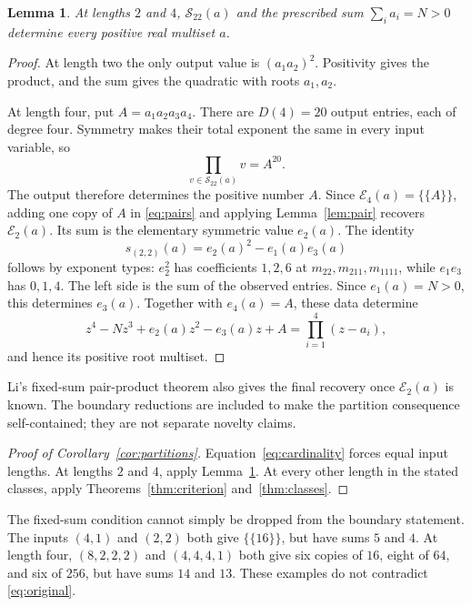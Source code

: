 \documentclass[11pt]{amsart}
\newtheorem{lemma}[theorem]{Lemma}
\theoremstyle{remark}
\newcommand{\Sxx}{\mathcal{S}_{22}}
\begin{document}
\begin{lemma}\label{lem:boundary}
At lengths $2$ and $4$, $\Sxx(a)$ and the prescribed sum
$\sum_i a_i=N>0$ determine every positive real multiset $a$.
\end{lemma}

\begin{proof}
At length two the only output value is $(a_1a_2)^2$. Positivity gives
the product, and the sum gives the quadratic with roots $a_1,a_2$.

At length four, put $A=a_1a_2a_3a_4$. There are $D(4)=20$ output
entries, each of degree four. Symmetry makes their total exponent the
same in every input variable, so
\[
 \prod_{v\in\Sxx(a)}v=A^{20}.
\]
The output therefore determines the positive number $A$. Since
$\mathcal E_4(a)=\{\!\{A\}\!\}$, adding one copy of $A$ in
\eqref{eq:pairs} and applying Lemma~\ref{lem:pair} recovers
$\mathcal E_2(a)$. Its sum is the elementary symmetric value $e_2(a)$.
The identity
\begin{equation}\label{eq:elementary}
 s_{(2,2)}(a)=e_2(a)^2-e_1(a)e_3(a)
\end{equation}
follows by exponent types: $e_2^2$ has coefficients $1,2,6$ at
$m_{22},m_{211},m_{1111}$, while $e_1e_3$ has $0,1,4$.
The left side is the sum of the observed entries. Since $e_1(a)=N>0$,
this determines $e_3(a)$. Together with $e_4(a)=A$, these data determine
\[
 z^4-Nz^3+e_2(a)z^2-e_3(a)z+A=\prod_{i=1}^4(z-a_i),
\]
and hence its positive root multiset.
\end{proof}

Li's fixed-sum pair-product theorem
\cite[Theorem~1 and the following positive-real extension]{Li2026}
also gives the final recovery once $\mathcal E_2(a)$ is known. The
boundary reductions are included to make the partition consequence
self-contained; they are not separate novelty claims.

\begin{proof}[Proof of Corollary~\ref{cor:partitions}]
Equation~\eqref{eq:cardinality} forces equal input lengths. At lengths
$2$ and $4$, apply Lemma~\ref{lem:boundary}. At every other length in
the stated classes, apply Theorems~\ref{thm:criterion} and~\ref{thm:classes}.
\end{proof}

The fixed-sum condition cannot simply be dropped from the boundary
statement. The inputs $(4,1)$ and $(2,2)$ both give $\{\!\{16\}\!\}$, but
have sums $5$ and $4$. At length four, $(8,2,2,2)$ and $(4,4,4,1)$
both give six copies of $16$, eight of $64$, and six of $256$, but
have sums $14$ and $13$. These examples do not contradict
\eqref{eq:original}.
\end{document}
